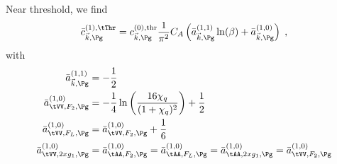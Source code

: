 Near threshold, we find
\begin{equation}
\bar c_{\vec k,\Pg}^{(1),\tThr} = c_{\vec k,\Pg}^{(0),\text{thr}} \frac{1}{\pi^2}
     C_A\left(\bar a_{\vec k,\Pg}^{(1,1)}\ln(\beta) + \bar a_{\vec k,\Pg}^{(1,0)}\right)\;,
\end{equation} 
with
\begin{align}
\bar a^{(1,1)}_{\vec k,\Pg} &= -\frac 1 2\\
\bar a^{(1,0)}_{\tVV,F_2,\Pg} &= -\frac 1 4 \ln\left(\frac{16\chi_q}{(1+\chi_q)^2}\right)+\frac 1 2\\
\bar a^{(1,0)}_{\tVV,F_L,\Pg} &= \bar a^{(1,0)}_{\tVV,F_2,\Pg} + \frac 1 6\\
\bar a^{(1,0)}_{\tVV,2xg_1,\Pg} &= \bar a^{(1,0)}_{\tAA,F_2,\Pg} = \bar a^{(1,0)}_{\tAA,F_L,\Pg} = \bar a^{(1,0)}_{\tAA,2xg_1,\Pg}= \bar a^{(1,0)}_{\tVV,F_2,\Pg}
\end{align}
